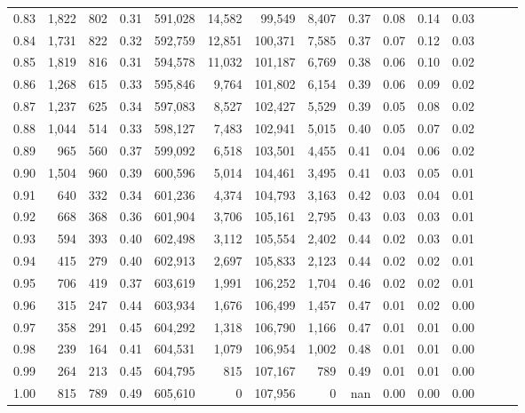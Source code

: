 \begin{tabular}{rrrrrrrrrrrrrrr}
0.83 &   1,822 &    802 &  0.31 &  591,028 &   14,582 &   99,549 &    8,407 &  0.37 &  0.08 &  0.14 &      0.03 \\
0.84 &   1,731 &    822 &  0.32 &  592,759 &   12,851 &  100,371 &    7,585 &  0.37 &  0.07 &  0.12 &      0.03 \\
0.85 &   1,819 &    816 &  0.31 &  594,578 &   11,032 &  101,187 &    6,769 &  0.38 &  0.06 &  0.10 &      0.02 \\
0.86 &   1,268 &    615 &  0.33 &  595,846 &    9,764 &  101,802 &    6,154 &  0.39 &  0.06 &  0.09 &      0.02 \\
0.87 &   1,237 &    625 &  0.34 &  597,083 &    8,527 &  102,427 &    5,529 &  0.39 &  0.05 &  0.08 &      0.02 \\
0.88 &   1,044 &    514 &  0.33 &  598,127 &    7,483 &  102,941 &    5,015 &  0.40 &  0.05 &  0.07 &      0.02 \\
0.89 &     965 &    560 &  0.37 &  599,092 &    6,518 &  103,501 &    4,455 &  0.41 &  0.04 &  0.06 &      0.02 \\
0.90 &   1,504 &    960 &  0.39 &  600,596 &    5,014 &  104,461 &    3,495 &  0.41 &  0.03 &  0.05 &      0.01 \\
0.91 &     640 &    332 &  0.34 &  601,236 &    4,374 &  104,793 &    3,163 &  0.42 &  0.03 &  0.04 &      0.01 \\
0.92 &     668 &    368 &  0.36 &  601,904 &    3,706 &  105,161 &    2,795 &  0.43 &  0.03 &  0.03 &      0.01 \\
0.93 &     594 &    393 &  0.40 &  602,498 &    3,112 &  105,554 &    2,402 &  0.44 &  0.02 &  0.03 &      0.01 \\
0.94 &     415 &    279 &  0.40 &  602,913 &    2,697 &  105,833 &    2,123 &  0.44 &  0.02 &  0.02 &      0.01 \\
0.95 &     706 &    419 &  0.37 &  603,619 &    1,991 &  106,252 &    1,704 &  0.46 &  0.02 &  0.02 &      0.01 \\
0.96 &     315 &    247 &  0.44 &  603,934 &    1,676 &  106,499 &    1,457 &  0.47 &  0.01 &  0.02 &      0.00 \\
0.97 &     358 &    291 &  0.45 &  604,292 &    1,318 &  106,790 &    1,166 &  0.47 &  0.01 &  0.01 &      0.00 \\
0.98 &     239 &    164 &  0.41 &  604,531 &    1,079 &  106,954 &    1,002 &  0.48 &  0.01 &  0.01 &      0.00 \\
0.99 &     264 &    213 &  0.45 &  604,795 &      815 &  107,167 &      789 &  0.49 &  0.01 &  0.01 &      0.00 \\
1.00 &     815 &    789 &  0.49 &  605,610 &        0 &  107,956 &        0 &   nan &  0.00 &  0.00 &      0.00 \\
\bottomrule
\end{tabular}
